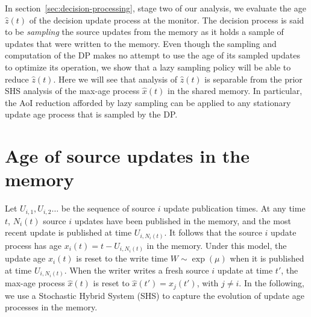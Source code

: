 \documentclass[conference, 10pt]{IEEEtran}
\newcommand{\maxage}{\hat{x}}
\newcommand{\monage}{\hat{z}}
\newcommand{\RY}[1]{\quad {\color{red} #1} \quad}
\newcommand{\MOVE}[2][\mbox{}]{{\color{purple}MOVE: {\color{blue} #1}\ #2}\newline}
\begin{document}
In section~\ref{sec:decision-processing}, stage two of our analysis, we 
evaluate the age $\monage(t)$ of the decision update process at the monitor. 
The decision process is said to be {\em sampling} the source updates from the memory as it holds a sample of updates that were written to the memory.
Even though the sampling and computation of the DP makes no attempt to use the age of its sampled updates to optimize its operation, 
we show that a lazy sampling policy  will be able to reduce  $\monage(t)$. Here we will see that analysis of $\monage(t)$ is separable from the prior SHS analysis of the max-age process $\maxage(t)$  in the shared memory. In particular, the AoI reduction afforded by lazy sampling can be applied to any stationary update age process that is sampled by the DP. 

\section{Age of source updates in the memory} \label{sec:SHS}
Let $U_{i,1}, U_{i, 2} \ldots$ be the sequence of source $i$ update publication times. At any time $t$, $N_i(t)$ source $i$ updates have been published in the memory, and the most recent update is published at time $U_{i, N_i(t)}$.  It follows that the source $i$ update process has age
 $   x_i(t) = t - U_{i, N_i(t)}$
in the memory.
Under this model, the update age $x_i(t)$ is reset to the write time $W \sim \exp(\mu)$ when it is published at time $U_{i,N_i(t)}$. 
When the writer writes a fresh source $i$ update at time $t'$, the max-age process $\maxage(t)$ is reset to $\hat{x}(t') = x_j(t')$, with $j \neq i$. In the following, we use a Stochastic Hybrid System (SHS) to capture the evolution of update age processes in the memory.
\end{document}
